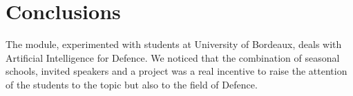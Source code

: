 \documentclass[conference]{IEEEtran}
\begin{document}

\section{Conclusions}
The module, experimented with students at University of Bordeaux, deals with Artificial Intelligence for Defence. We noticed that the combination of seasonal schools, invited speakers and a project was a real incentive to raise the attention of the students to the topic but also to the field of Defence.
\end{document}
